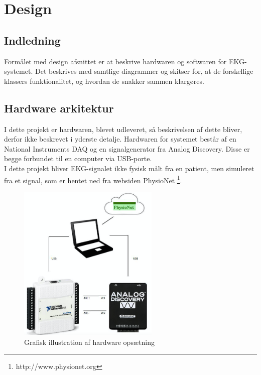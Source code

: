 \chapter{Design}

\section{Indledning}
Formålet med design afsnittet er at beskrive hardwaren og softwaren for EKG-systemet. Det beskrives med samtlige diagrammer og skitser for, at de forskellige klassers funktionalitet, og hvordan de snakker sammen klargøres.
  
\section{Hardware arkitektur}
I dette projekt er hardwaren, blevet udleveret, så beskrivelsen af dette bliver, derfor ikke beskrevet i yderste detalje. Hardwaren for systemet består af en National Instruments DAQ og en signalgenerator fra Analog Discovery. Disse er begge forbundet til en computer via USB-porte.
\\ 
I dette projekt bliver EKG-signalet ikke fysisk målt fra en patient, men simuleret fra et signal, som er hentet ned fra websiden PhysioNet \footnote{http://www.physionet.org}. 

\begin{figure}[H]
	\centering
	\includegraphics[width=0.6\textwidth]{Figurer/Snip20150427_1}
	\caption{Grafisk illustration af hardware opsætning}
\end{figure}

